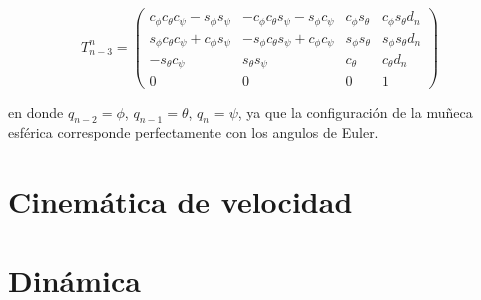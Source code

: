 \begin{multicols*}{2}
            \begin{equation}
                T_{n-3}^n =
                \begin{pmatrix}
                    c_{\phi} c_{\theta} c_{\psi} - s_{\phi} s_{\psi} & - c_{\phi} c_{\theta} s_{\psi} - s_{\phi} c_{\psi} & c_{\phi} s_{\theta} & c_{\phi} s_{\theta} d_n \\
                    s_{\phi} c_{\theta} c_{\psi} + c_{\phi} s_{\psi} & - s_{\phi} c_{\theta} s_{\psi} + c_{\phi} c_{\psi} & s_{\phi} s_{\theta} & s_{\phi} s_{\theta} d_n \\
                    - s_{\theta} c_{\psi} & s_{\theta} s_{\psi} & c_{\theta} & c_{\theta} d_n \\
                    0 & 0 & 0 & 1
                \end{pmatrix}
            \end{equation}

            en donde $q_{n-2} = \phi$, $q_{n-1} = \theta$, $q_{n} = \psi$, ya que la configuración de la muñeca esférica corresponde perfectamente con los angulos de Euler.


    \section{Cinemática de velocidad}


    \section{Dinámica}

\end{multicols*}


